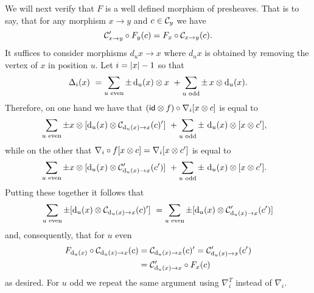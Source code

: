 We will next verify that $F$ is a well defined morphism of presheaves.
That is to say, that for any morphism $x \to y$ and $c \in \mathcal{C}_y$ we have
\[
\mathcal{C}'_{x \to y} \circ F_y(c) = F_x \circ \mathcal{C}_{x \to y}(c).
\]
It suffices to consider morphisms $d_u x \to x$ where $d_u x$ is obtained by removing the vertex of $x$ in position $u$.
Let $i = \lvert x\rvert-1$ so that
\[
\Delta_i(x) \ =
\sum_{u \text{ even}} \pm \operatorname{d}_u(x) \otimes x \ +
\sum_{u \text{ odd}} \pm \, x \otimes \operatorname{d}_u(x).
\]
Therefore, on one hand we have that $(\mathsf{id} \otimes f) \circ \nabla_i [x \otimes c]$ is equal to
\begin{align*}
	&\sum_{u \text{ even}} \pm x \otimes [\operatorname{d}_u(x) \otimes \mathcal{C}_{\operatorname{d}_u(x) \to x}(c)'] \ +
	\sum_{u \text{ odd}} \pm \, \operatorname{d}_u(x) \otimes [x \otimes c'],
\end{align*}
while on the other that $\nabla_i \circ f [x \otimes c] = \nabla_i [x \otimes c']$ is equal to
\begin{align*}
	&\sum_{u \text{ even}} \pm x \otimes [\operatorname{d}_u(x) \otimes \mathcal{C}'_{\operatorname{d}_u(x) \to x}(c')] \ +
	\sum_{u \text{ odd}} \pm \, \operatorname{d}_u(x) \otimes [x \otimes c'].
\end{align*}
Putting these together it follows that
\[
	\sum_{u \text{ even}} \pm [\operatorname{d}_u(x) \otimes \mathcal{C}_{\operatorname{d}_u(x) \to x}(c)'] \ =
	\sum_{u \text{ even}} \pm [\operatorname{d}_u(x) \otimes \mathcal{C}'_{\operatorname{d}_u(x) \to x}(c')]
\]
and, consequently, that for $u$ even
\begin{align*}
	F_{\operatorname{d}_u(x)} \circ \mathcal{C}_{\operatorname{d}_u(x) \to x}(c) &=
	\mathcal{C}_{\operatorname{d}_u(x) \to x}(c)' =
	\mathcal{C}'_{\operatorname{d}_u(x) \to x}(c') \\ &=
	\mathcal{C}'_{\operatorname{d}_u(x) \to x} \circ F_{x}(c)
\end{align*}
as desired.
For $u$ odd we repeat the same argument using $\nabla_i^T$ instead of $\nabla_i$.
